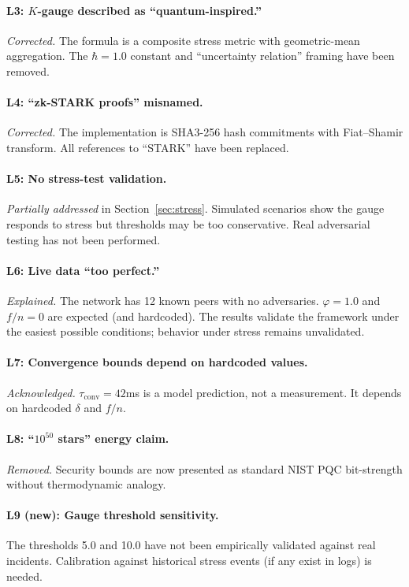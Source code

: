 \documentclass[11pt,a4paper]{article}
\begin{document}
\paragraph{L3: $K$-gauge described as ``quantum-inspired.''} \emph{Corrected.} The formula is a composite stress metric with geometric-mean aggregation. The $\hbar = 1.0$ constant and ``uncertainty relation'' framing have been removed.

\paragraph{L4: ``zk-STARK proofs'' misnamed.} \emph{Corrected.} The implementation is SHA3-256 hash commitments with Fiat--Shamir transform. All references to ``STARK'' have been replaced.

\paragraph{L5: No stress-test validation.} \emph{Partially addressed} in Section~\ref{sec:stress}. Simulated scenarios show the gauge responds to stress but thresholds may be too conservative. Real adversarial testing has not been performed.

\paragraph{L6: Live data ``too perfect.''} \emph{Explained.} The network has 12 known peers with no adversaries. $\varphi = 1.0$ and $f/n = 0$ are expected (and hardcoded). The results validate the framework under the easiest possible conditions; behavior under stress remains unvalidated.

\paragraph{L7: Convergence bounds depend on hardcoded values.} \emph{Acknowledged.} $\tau_{\text{conv}} = 42$ms is a model prediction, not a measurement. It depends on hardcoded $\delta$ and $f/n$.

\paragraph{L8: ``$10^{50}$ stars'' energy claim.} \emph{Removed.} Security bounds are now presented as standard NIST PQC bit-strength without thermodynamic analogy.

\paragraph{L9 (new): Gauge threshold sensitivity.} The thresholds 5.0 and 10.0 have not been empirically validated against real incidents. Calibration against historical stress events (if any exist in logs) is needed.
\end{document}
